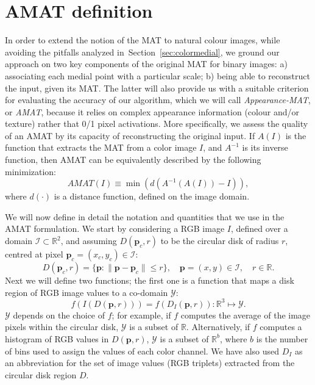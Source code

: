 \documentclass{article}
\newcommand{\refsec}[1]{Section~\ref{#1}}
\newcommand{\norm}[1]{\| #1 \|}
\newcommand{\set}[1]{\mathcal{#1}}
\renewcommand{\vec}[1]{\mathbf{#1}}
\def\point{\vec{p}}
\def\setreals{\mathbb{R}}
\def\image{\set{I}}
\begin{document}
\section{AMAT definition}\label{sec:amat}
In order to extend the notion of the MAT to natural colour images, while avoiding the pitfalls
analyzed in~\refsec{sec:colormedial}, we ground our approach on two key components of the original MAT for binary images:
a) associating each medial point with a particular scale; b) being able to reconstruct the input, given its MAT.
The latter will also provide us with a suitable criterion for evaluating the accuracy of our algorithm, which we will 
call \emph{Appearance-MAT}, or \emph{AMAT}, because it relies on complex appearance information (colour and/or texture) rather that 0/1 pixel activations.
More specifically, we assess the quality of an AMAT by its capacity of reconstructing the original input.
If $A(I)$ is the function that extracts the MAT from a color image $I$, and $A^{-1}$ is its inverse
function, then AMAT can be equivalently described by the following minimization:
\begin{equation}
AMAT(I) \equiv \min\left(d\left( A^{-1}\left( A(I) \right) - I\right) \right), 
\label{eq:amatmin}
\end{equation}
where $d(\cdot)$ is a distance function, defined on the image domain.

We will now define in detail the notation and quantities that we use in the AMAT formulation.
We start by considering a RGB image $I$, defined over a domain $\image \subset \setreals^2$, 
and assuming $D(\point_c,r)$ to be the circular disk of radius $r$, centred at pixel $\point_c = (x_c,y_c) \in \image$:
\begin{equation}
D(\point_c,r) = \{\point: \norm{\point - \point_c} \leq r \},\quad \point = (x,y) \in \image, \quad r \in \setreals. 
\label{eq:disk}
\end{equation}
Next we will define two functions; the first one is a function that maps a disk region of 
RGB image values to a co-domain $\set{Y}$:
\begin{equation}
f\left( I\left( D(\point,r) \right) \right) = f\left( D_I(\point,r) \right) : \setreals^3 \mapsto \set{Y}.
\label{eq:f}
\end{equation}
$\set{Y}$ depends on the choice of $f$; for example, if $f$ computes the average of the image pixels within the
circular disk, $\set{Y}$ is a subset of $\setreals$. 
Alternatively, if $f$ computes a histogram of RGB values in $D(\point,r)$, $\set{Y}$
is a subset of $\setreals^b$, where $b$ is the number of bins used to assign the values of each color channel.
We have also used $D_I$ as an abbreviation for the set of image values (RGB triplets) extracted from 
the circular disk region $D$.
\end{document}
